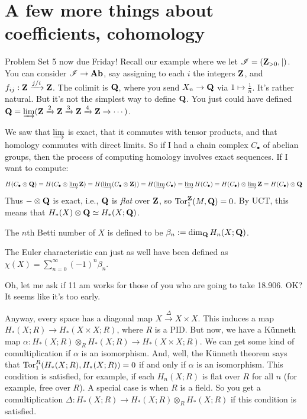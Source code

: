 \section{A few more things about coefficients, cohomology}
Problem Set 5 now due Friday! Recall our example where we let $\mathscr I=(\mathbf Z_{>0},|)$. You can consider $\mathscr I\to\mathbf{Ab}$, say assigning to each $i$ the integers $\mathbf Z$, and $f_{ij}:\mathbf Z\xrightarrow{j/i}\mathbf Z$. The colimit is $\mathbf Q$, where you send $X_n\to\mathbf Q$ via $1\mapsto \frac{1}{n}$. It's rather natural. But it's not the simplest way to define $\mathbf Q$. You just could have defined $\mathbf Q=\varinjlim(\mathbf Z\xrightarrow{2}\mathbf Z\xrightarrow{3}\mathbf Z\xrightarrow{4}\mathbf Z\to\cdots)$.

We saw that $\varinjlim$ is exact, that it commutes with tensor products, and that homology commutes with direct limits. So if I had a chain complex $C_\bullet$ of abelian groups, then the process of computing homology involves exact sequences. If I want to compute:
\begin{equation*}
 H(C_\bullet\otimes\mathbf Q)= H(C_\bullet\otimes\varinjlim \mathbf Z)= H(\varinjlim(C_\bullet\otimes\mathbf Z))= H(\varinjlim C_\bullet)=\varinjlim H(C_\bullet)= H(C_\bullet)\otimes\varinjlim \mathbf Z= H(C_\bullet)\otimes\mathbf Q
\end{equation*}
Thus $-\otimes\mathbf Q$ is exact, i.e., $\mathbf Q$ is \emph{flat} over $\mathbf Z$, so $\operatorname{Tor}^\mathbf Z_1(M,\mathbf Q)=0$. By UCT, this means that $ H_\ast(X)\otimes \mathbf Q\simeq H_\ast(X;\mathbf Q)$.
\begin{definition}
The $n$th Betti number of $X$ is defined to be $\beta_n:=\dim_\mathbf Q H_n(X;\mathbf Q)$.
\end{definition}
The Euler characteristic can just as well have been defined as $\chi(X)=\sum^\infty_{n=0}(-1)^n\beta_n$.

Oh, let me ask if 11 am works for those of you who are going to take 18.906. OK? It seems like it's too early.

Anyway, every space has a diagonal map $X\xrightarrow{\Delta}X\times X$. This induces a map $ H_\ast(X;R)\to H_\ast(X\times X;R)$, where $R$ is a PID. But now, we have a K\"{u}nneth map $\alpha: H_\ast(X;R)\otimes_R H_\ast(X;R)\to H_\ast(X\times X;R)$. We can get some kind of comultiplication if $\alpha$ is an isomorphism. And, well, the K\"{u}nneth theorem says that $\operatorname{Tor}^R_1( H_\ast(X;R), H_\ast(X;R))=0$ if and only if $\alpha$ is an isomorphism. This condition is satisfied, for example, if each $ H_n(X;R)$ is flat over $R$ for all $n$ (for example, free over $R$). A special case is when $R$ is a field. So you get a comultiplication $\Delta: H_\ast(X;R)\to H_\ast(X;R)\otimes_R H_\ast(X;R)$ if this condition is satisfied.

